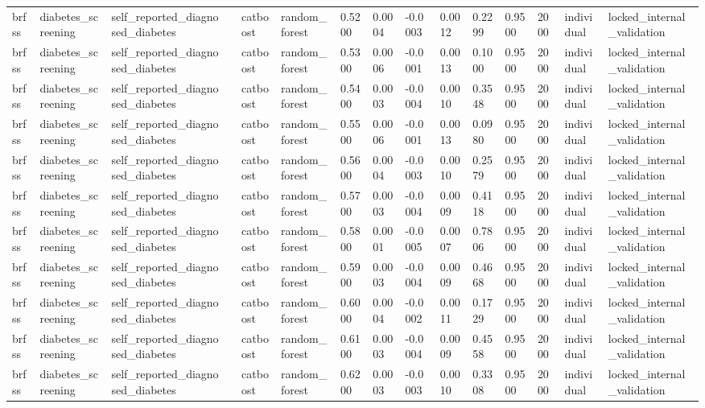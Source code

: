 \begin{tabular}{lllllllllllllll}
brfss & diabetes\_screening & self\_reported\_diagnosed\_diabetes &  & catboost & random\_forest & 0.5200 & 0.0004 & -0.0003 & 0.0012 & 0.2299 & 0.9500 & 2000 & individual & locked\_internal\_validation \\
brfss & diabetes\_screening & self\_reported\_diagnosed\_diabetes &  & catboost & random\_forest & 0.5300 & 0.0006 & -0.0001 & 0.0013 & 0.1000 & 0.9500 & 2000 & individual & locked\_internal\_validation \\
brfss & diabetes\_screening & self\_reported\_diagnosed\_diabetes &  & catboost & random\_forest & 0.5400 & 0.0003 & -0.0004 & 0.0010 & 0.3548 & 0.9500 & 2000 & individual & locked\_internal\_validation \\
brfss & diabetes\_screening & self\_reported\_diagnosed\_diabetes &  & catboost & random\_forest & 0.5500 & 0.0006 & -0.0001 & 0.0013 & 0.0980 & 0.9500 & 2000 & individual & locked\_internal\_validation \\
brfss & diabetes\_screening & self\_reported\_diagnosed\_diabetes &  & catboost & random\_forest & 0.5600 & 0.0004 & -0.0003 & 0.0010 & 0.2579 & 0.9500 & 2000 & individual & locked\_internal\_validation \\
brfss & diabetes\_screening & self\_reported\_diagnosed\_diabetes &  & catboost & random\_forest & 0.5700 & 0.0003 & -0.0004 & 0.0009 & 0.4118 & 0.9500 & 2000 & individual & locked\_internal\_validation \\
brfss & diabetes\_screening & self\_reported\_diagnosed\_diabetes &  & catboost & random\_forest & 0.5800 & 0.0001 & -0.0005 & 0.0007 & 0.7806 & 0.9500 & 2000 & individual & locked\_internal\_validation \\
brfss & diabetes\_screening & self\_reported\_diagnosed\_diabetes &  & catboost & random\_forest & 0.5900 & 0.0003 & -0.0004 & 0.0009 & 0.4668 & 0.9500 & 2000 & individual & locked\_internal\_validation \\
brfss & diabetes\_screening & self\_reported\_diagnosed\_diabetes &  & catboost & random\_forest & 0.6000 & 0.0004 & -0.0002 & 0.0011 & 0.1729 & 0.9500 & 2000 & individual & locked\_internal\_validation \\
brfss & diabetes\_screening & self\_reported\_diagnosed\_diabetes &  & catboost & random\_forest & 0.6100 & 0.0003 & -0.0004 & 0.0009 & 0.4558 & 0.9500 & 2000 & individual & locked\_internal\_validation \\
brfss & diabetes\_screening & self\_reported\_diagnosed\_diabetes &  & catboost & random\_forest & 0.6200 & 0.0003 & -0.0003 & 0.0010 & 0.3308 & 0.9500 & 2000 & individual & locked\_internal\_validation \\

\end{tabular}
